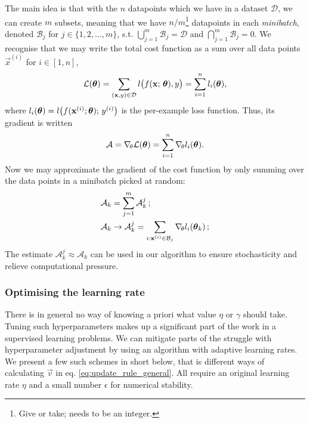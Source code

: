         The main idea is that with the $n$ datapoints which we have in a dataset $\mathcal{D}$, we can create $m$ subsets, meaning that we have $n/m$\footnote{Give or take; needs to be an integer.} datapoints in each \textit{minibatch}, denoted $\mathcal{B}_j$ for $j\in\{1,2,\dots,m\}$, s.t. $\bigcup_{j=1}^m \mathcal{B}_j = \mathcal{D}$ and $\bigcap_{j=1}^m \mathcal{B}_j = 0$. We recognise that we may write the total cost function as a sum over all data points $\vec{x}^{(i)}$ for $i\in[1,n]$, 
        \begin{equation}
            \mathcal{L}(\boldsymbol{\theta}) =\sum_{(\mathbf{x}, y)\in \mathcal{D}} l\big(f(\mathbf{x};\,\boldsymbol{\theta}), y \big) = \sum_{i=1}^n l_i(\boldsymbol{\theta}),
        \end{equation}
        where $l_i(\boldsymbol{\theta}) = l\big(f(\mathbf{x}^{(i)};\boldsymbol{\theta}); \, y^{(i)}\big)$ is the per-example loss function. Thus, its gradient is written
        \begin{equation}
            \mathcal{A} = \nabla_{\!\theta} \mathcal{L}(\boldsymbol{\theta}) = \sum_{i=1}^n \nabla_{\!\theta}l_i(\boldsymbol{\theta}).
        \end{equation}
        Now we may approximate the gradient of the cost function by only summing over the data points in a minibatch picked at random:
        \begin{equation}\label{eq:sgd_gradient}
            \begin{split}
            \mathcal{A}_k &= \sum_{j=1}^{m}\mathcal{A}_k^j\, ; \\
            \mathcal{A}_k &\to \mathcal{A}^j_k = \sum_{i:\mathbf{x}^{(i)} \in\mathcal{B}_j }\nabla_{\!\theta} l_i(\boldsymbol{\theta}_k)\, ;
            \end{split}
        \end{equation}
        The estimate $\mathcal{A}_k^j \approx \mathcal{A}_k$ can be used in our algorithm to ensure stochasticity and relieve computational pressure.
    
    \subsubsection{Optimising the learning rate}\label{sec:tuning}
    
    There is in general no way of knowing a priori what value $\eta$ or $\gamma$ should take. Tuning such hyperparameters makes up a significant part of the work in a supervised learning problems. We can mitigate parts of the struggle with hyperparameter adjustment by using an algorithm with adaptive learning rates. We present a few such schemes in short below, that is different ways of calculating $\vec{v}$ in eq. \eqref{eq:update_rule_general}. All require an original learning rate $\eta$ and a small number $\epsilon$ for numerical stability. 

